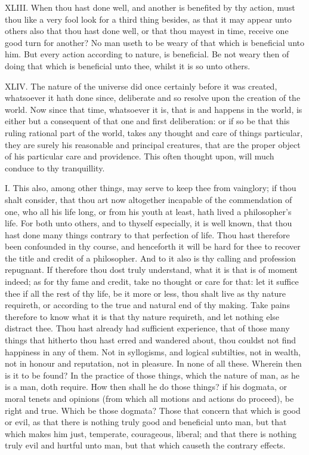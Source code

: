 XLIII. When thou hast done well, and another is benefited by thy action,
must thou like a very fool look for a third thing besides, as that it may
appear unto others also that thou hast done well, or that thou mayest in
time, receive one good turn for another? No man useth to be weary of that
which is beneficial unto him. But every action according to nature, is
beneficial. Be not weary then of doing that which is beneficial unto thee,
whilst it is so unto others.

XLIV. The nature of the universe did once certainly before it was
created, whatsoever it hath done since, deliberate and so resolve upon the
creation of the world. Now since that time, whatsoever it is, that is and
happens in the world, is either but a consequent of that one and first
deliberation: or if so be that this ruling rational part of the world,
takes any thought and care of things particular, they are surely his
reasonable and principal creatures, that are the proper object of his
particular care and providence. This often thought upon, will much conduce
to thy tranquillity.


I. This also, among other things, may serve to keep thee from vainglory;
if thou shalt consider, that thou art now altogether incapable of the
commendation of one, who all his life long, or from his youth at least,
hath lived a philosopher's life. For both unto others, and to thyself
especially, it is well known, that thou hast done many things contrary to
that perfection of life. Thou hast therefore been confounded in thy
course, and henceforth it will be hard for thee to recover the title and
credit of a philosopher. And to it also is thy calling and profession
repugnant. If therefore thou dost truly understand, what it is that is of
moment indeed; as for thy fame and credit, take no thought or care for
that: let it suffice thee if all the rest of thy life, be it more or less,
thou shalt live as thy nature requireth, or according to the true and
natural end of thy making. Take pains therefore to know what it is that
thy nature requireth, and let nothing else distract thee. Thou hast
already had sufficient experience, that of those many things that hitherto
thou hast erred and wandered about, thou couldst not find happiness in any
of them. Not in syllogisms, and logical subtilties, not in wealth, not in
honour and reputation, not in pleasure. In none of all these. Wherein then
is it to be found? In the practice of those things, which the nature of
man, as he is a man, doth require. How then shall he do those things? if
his dogmata, or moral tenets and opinions (from which all motions and
actions do proceed), be right and true. Which be those dogmata? Those that
concern that which is good or evil, as that there is nothing truly good
and beneficial unto man, but that which makes him just, temperate,
courageous, liberal; and that there is nothing truly evil and hurtful unto
man, but that which causeth the contrary effects.

